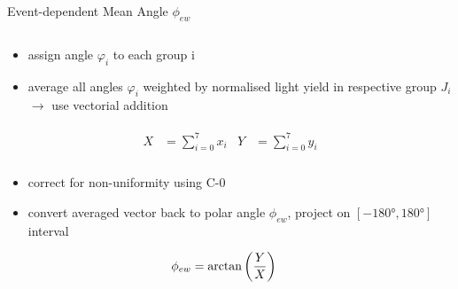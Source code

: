 \documentclass[aspectratio=169]{beamer}
\begin{document}
\begin{frame}{Event-dependent Mean Angle $\phi_{ew}$}
\begin{columns}
			\begin{column}{.5\textwidth}
				\vspace{-1cm}
				\begin{itemize}
					\item assign angle $\varphi_{i}$ to each group i
					\item average all angles $\varphi_{i}$ weighted by normalised light yield in respective group $J_i$ $\rightarrow$ use vectorial addition
				\end{itemize}
			\vspace{-.4cm}
			\begin{gather}
				\begin{align*}
					X  &= \sum_{i=0}^{7} x_{i}
					& Y &= \sum_{i=0}^{7} y_{i}\\	
				\end{align*}
			\end{gather}
		\vspace{-1cm}
				\begin{itemize}
					\item correct for non-uniformity using C-0
					\item convert averaged vector back to polar angle $\phi_{ew}$, project on $\left[-\ang{180},\ang{180}\right]$ interval
				\end{itemize}
					\begin{align*}
						 \phi_{ew} &=      \arctan\qty(\frac{Y}{X})											
					\end{align*}
			
				
				
			\end{column}
		
		\end{columns}
	\end{frame}
	
\end{document}
